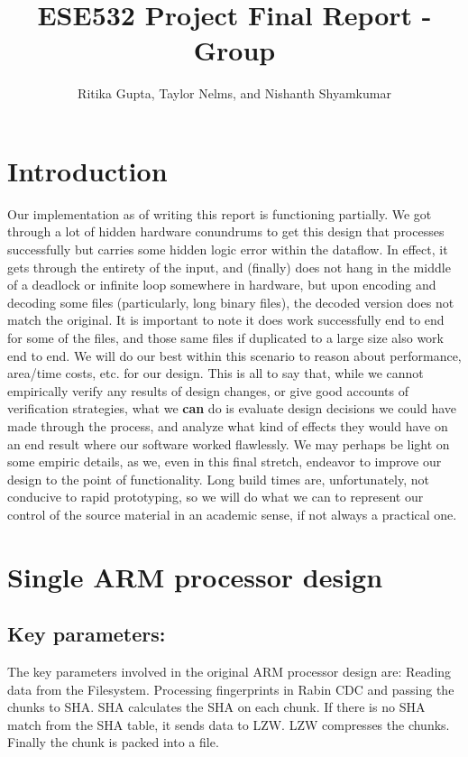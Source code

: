 \documentclass{article}
\title{ESE532 Project Final Report - Group}
\author{Ritika Gupta, Taylor Nelms, and Nishanth Shyamkumar}
\begin{document}
\maketitle

\section{Introduction}
Our implementation as of writing this report is functioning partially. We got through a lot of hidden hardware conundrums to get this design that processes successfully but carries some hidden logic error within the dataflow.
In effect, it gets through the entirety of the input, and (finally) does not hang in the middle of a deadlock or infinite loop somewhere in hardware, but upon encoding and decoding some files (particularly, long binary files), the decoded version does not match the original.
It is important to note it does work successfully end to end for some of the files, and those same files if duplicated to a large size also work end to end. 
\newline\newline
We will do our best within this scenario to reason about performance, area/time costs, etc. for our design. 
\newline\newline
This is all to say that, while we cannot empirically verify any results of design changes, or give good accounts of verification strategies, what we \textbf{can} do is evaluate design decisions we could have made through the process, and analyze what kind of effects they would have on an end result where our software worked flawlessly.
\newline\newline
We may perhaps be light on some empiric details, as we, even in this final stretch, endeavor to improve our design to the point of functionality. Long build times are, unfortunately, not conducive to rapid prototyping, so we will do what we can to represent our control of the source material in an academic sense, if not always a practical one.

\section{Single ARM processor design}
\subsection{Key parameters:}
The key parameters involved in the original ARM processor design are:
\newline\newline
Reading data from the Filesystem.
\newline
Processing fingerprints in Rabin CDC and passing the chunks to SHA.
\newline
SHA calculates the SHA on each chunk. 
\newline
If there is no SHA match from the SHA table, it sends data to LZW.
\newline
LZW compresses the chunks.
\newline
Finally the chunk is packed into a file.
\newline
\end{document}
